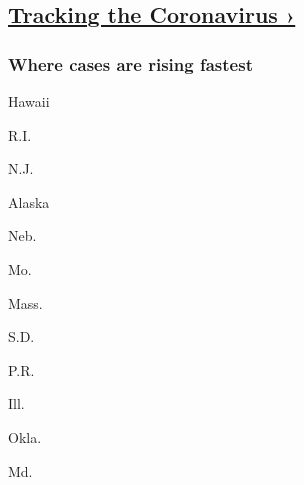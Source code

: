 \hypertarget{tracking-the-coronavirus-}{%
\subsection{\texorpdfstring{\href{https://www.nytimes.com/interactive/2020/us/coronavirus-us-cases.html}{Tracking
the Coronavirus
›}}{Tracking the Coronavirus ›}}\label{tracking-the-coronavirus-}}

\href{https://www.nytimes.com/interactive/2020/us/coronavirus-us-cases.html}{}

\hypertarget{where-cases-are-rising-fastest}{%
\subsubsection{\texorpdfstring{Where cases are \textbf{rising}
fastest}{Where cases are rising fastest}}\label{where-cases-are-rising-fastest}}

\href{https://www.nytimes.com/interactive/2020/us/hawaii-coronavirus-cases.html}{}

Hawaii
\href{https://www.nytimes.com/interactive/2020/us/rhode-island-coronavirus-cases.html}{}

R.I.
\href{https://www.nytimes.com/interactive/2020/us/new-jersey-coronavirus-cases.html}{}

N.J.
\href{https://www.nytimes.com/interactive/2020/us/alaska-coronavirus-cases.html}{}

Alaska
\href{https://www.nytimes.com/interactive/2020/us/nebraska-coronavirus-cases.html}{}

Neb.
\href{https://www.nytimes.com/interactive/2020/us/missouri-coronavirus-cases.html}{}

Mo.
\href{https://www.nytimes.com/interactive/2020/us/massachusetts-coronavirus-cases.html}{}

Mass.
\href{https://www.nytimes.com/interactive/2020/us/south-dakota-coronavirus-cases.html}{}

S.D.
\href{https://www.nytimes.com/interactive/2020/us/puerto-rico-coronavirus-cases.html}{}

P.R.
\href{https://www.nytimes.com/interactive/2020/us/illinois-coronavirus-cases.html}{}

Ill.
\href{https://www.nytimes.com/interactive/2020/us/oklahoma-coronavirus-cases.html}{}

Okla.
\href{https://www.nytimes.com/interactive/2020/us/maryland-coronavirus-cases.html}{}

Md.

\href{https://www.nytimes.com/interactive/2020/us/coronavirus-us-cases.html}{}

